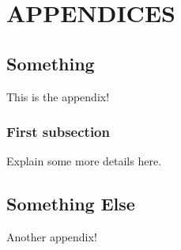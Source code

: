 
\chapter*{APPENDICES}

\section{Something}
This is the appendix!

\subsection{First subsection}
Explain some more details here.


\section{Something Else}
Another appendix!